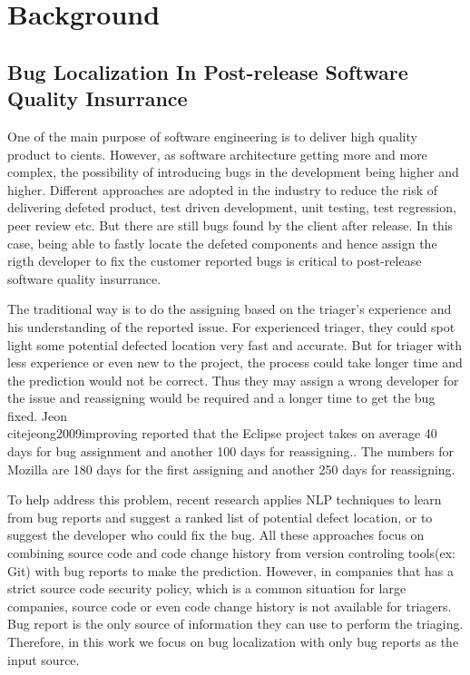 \section{Background}
\subsection{Bug Localization In Post-release Software Quality Insurrance}
One of the main purpose of software engineering is to deliver high quality product to cients.
However, as software architecture getting more and more complex, the possibility of introducing bugs in the development being higher and higher.  
Different approaches are adopted in the industry to reduce the risk of delivering defeted product, test driven development, unit testing, test regression, peer review etc.
But there are still bugs found by the client after release. 
In this case, being able to fastly locate the defeted components and hence assign the rigth developer to fix the customer reported bugs is critical to post-release software quality insurrance. 

The traditional way is to do the assigning based on the triager's experience and his understanding of the reported issue. 
For experienced triager, they could spot light some potential defected location very fast and accurate.
But for triager with less experience or even new to the project, the process could take longer time and the prediction would not be correct.
Thus they may assign a wrong developer for the issue and reassigning would be required and a longer time to get the bug fixed. 
Jeon \etal\\cite{jeong2009improving} reported that the Eclipse project takes on average 40 days for bug assignment and another 100 days for reassigning..
The numbers for Mozilla are 180 days for the first assigning and another 250 days for reassigning.

To help address this problem, recent research applies NLP techniques to learn from bug reports and suggest a ranked list of potential defect location\cite{gay2009use}\cite{lam2017bug}\cite{nguyen2011topic}\cite{zhou2012should}\cite{saha2013improving}\cite{shokripour2013so}, or to suggest the developer who could fix the bug\cite{anvik2011reducing}\cite{bhattacharya2010fine}\cite{xuan2012developer}\cite{jonsson2016automated}.
All these approaches focus on combining source code and code change history from version controling tools(ex: Git)  with bug reports to make the prediction.
However, in companies that has a strict source code security policy, which is a common situation for large companies, source code or even code change history is not available for triagers. 
Bug report is the only source of information they can use to perform the triaging.   
Therefore, in this work we focus on bug localization with only bug reports as the input source.


